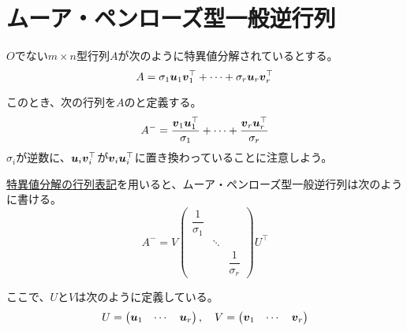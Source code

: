 \documentclass[../../../topic_linear-algebra]{subfiles}
\begin{document}
\sectionline
\section{ムーア・ペンローズ型一般逆行列}

$O$でない$m \times n$型行列$A$が次のように特異値分解されているとする。
\begin{equation*}
  A = \sigma_1\vb*{u}_1\vb*{v}_1^\top + \cdots + \sigma_r \vb*{u}_r \vb*{v}_r^\top
\end{equation*}

このとき、次の行列を$A$のと定義する。
\begin{equation*}
  A^- = \frac{\vb*{v}_1\vb*{u}_1^\top}{\sigma_1} + \cdots + \frac{\vb*{v}_r\vb*{u}_r^\top}{\sigma_r}
\end{equation*}
$\sigma_i$が逆数に、$\vb*{u}_i\vb*{v}_i^\top$が$\vb*{v}_i\vb*{u}_i^\top$に置き換わっていることに注意しよう。

\br

\hyperref[sec:matrix-form-svd]{特異値分解の行列表記}を用いると、ムーア・ペンローズ型一般逆行列は次のように書ける。
\begin{equation*}
  A^- = V \begin{pmatrix}
                        \dfrac{1}{\sigma_1} &        &           \\
                                  & \ddots &           \\
                                  &        & \dfrac{1}{\sigma_r}
                      \end{pmatrix} U^\top
\end{equation*}

ここで、$U$と$V$は次のように定義している。
\begin{equation*}
  U = \begin{pmatrix}
    \vb*{u}_1 & \cdots & \vb*{u}_r
  \end{pmatrix}, \quad
  V = \begin{pmatrix}
    \vb*{v}_1 & \cdots & \vb*{v}_r
  \end{pmatrix}
\end{equation*}

\br

\end{document}
